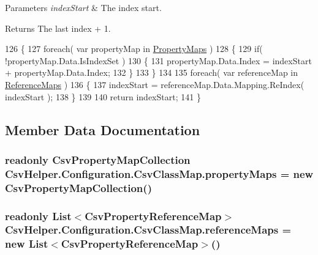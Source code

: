 \begin{DoxyParams}{Parameters}
{\em index\-Start} & The index start.\\
\hline
\end{DoxyParams}
\begin{DoxyReturn}{Returns}
The last index + 1.
\end{DoxyReturn}

\begin{DoxyCode}
126         \{
127             \textcolor{keywordflow}{foreach}( var propertyMap \textcolor{keywordflow}{in} \hyperlink{a00040_a9580e897abcba144f3101eb983348e25}{PropertyMaps} )
128             \{
129                 \textcolor{keywordflow}{if}( !propertyMap.Data.IsIndexSet )
130                 \{
131                     propertyMap.Data.Index = indexStart + propertyMap.Data.Index;
132                 \}
133             \}
134 
135             \textcolor{keywordflow}{foreach}( var referenceMap \textcolor{keywordflow}{in} \hyperlink{a00040_a6dfbf8f743b16d2ec83edef865ea2d9e}{ReferenceMaps} )
136             \{
137                 indexStart = referenceMap.Data.Mapping.ReIndex( indexStart );
138             \}
139 
140             \textcolor{keywordflow}{return} indexStart;
141         \}
\end{DoxyCode}


\subsection{Member Data Documentation}
\hypertarget{a00040_af2c164ac53fb00b7130fcfd334e3df94}{
\subsubsection[{property\-Maps}]{\setlength{\rightskip}{0pt plus 5cm}readonly {\bf Csv\-Property\-Map\-Collection} Csv\-Helper.\-Configuration.\-Csv\-Class\-Map.\-property\-Maps = new {\bf Csv\-Property\-Map\-Collection}()\hspace{0.3cm}{\ttfamily [private]}}}\label{a00040_af2c164ac53fb00b7130fcfd334e3df94}
\hypertarget{a00040_a440e190c61de45479816430d67930463}{
\subsubsection[{reference\-Maps}]{\setlength{\rightskip}{0pt plus 5cm}readonly List$<${\bf Csv\-Property\-Reference\-Map}$>$ Csv\-Helper.\-Configuration.\-Csv\-Class\-Map.\-reference\-Maps = new List$<${\bf Csv\-Property\-Reference\-Map}$>$()\hspace{0.3cm}{\ttfamily [private]}}}\label{a00040_a440e190c61de45479816430d67930463}


